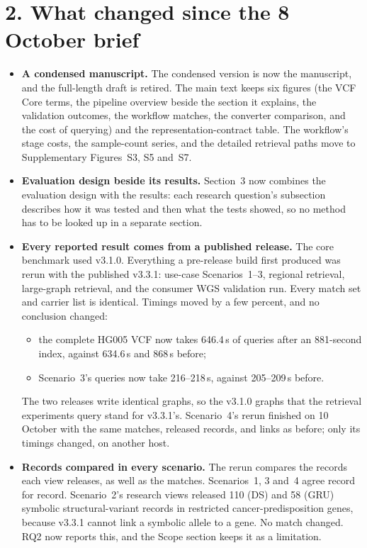 \documentclass[10pt]{article}
\begin{document}
\section{2. What changed since the 8 October brief}

\begin{itemize}
\item \textbf{A condensed manuscript.} The condensed version is now the manuscript, and the full-length draft is retired. The main text keeps six figures (the VCF Core terms, the pipeline overview beside the section it explains, the validation outcomes, the workflow matches, the converter comparison, and the cost of querying) and the representation-contract table. The workflow's stage costs, the sample-count series, and the detailed retrieval paths move to Supplementary Figures~S3, S5 and~S7.
\item \textbf{Evaluation design beside its results.} Section~3 now combines the evaluation design with the results: each research question's subsection describes how it was tested and then what the tests showed, so no method has to be looked up in a separate section.
\item \textbf{Every reported result comes from a published release.} The core benchmark used v3.1.0. Everything a pre-release build first produced was rerun with the published v3.3.1: use-case Scenarios~1--3, regional retrieval, large-graph retrieval, and the consumer WGS validation run. Every match set and carrier list is identical. Timings moved by a few percent, and no conclusion changed:
  \begin{itemize}
  \item the complete HG005 VCF now takes 646.4\,s of queries after an 881-second index, against 634.6\,s and 868\,s before;
  \item Scenario~3's queries now take 216--218\,s, against 205--209\,s before.
  \end{itemize}
  The two releases write identical graphs, so the v3.1.0 graphs that the retrieval experiments query stand for v3.3.1's. Scenario~4's rerun finished on 10 October with the same matches, released records, and links as before; only its timings changed, on another host.
\item \textbf{Records compared in every scenario.} The rerun compares the records each view releases, as well as the matches. Scenarios~1, 3 and~4 agree record for record. Scenario~2's research views released 110 (DS) and 58 (GRU) symbolic structural-variant records in restricted cancer-predisposition genes, because v3.3.1 cannot link a symbolic allele to a gene. No match changed. RQ2 now reports this, and the Scope section keeps it as a limitation.

\end{itemize}
\end{document}
